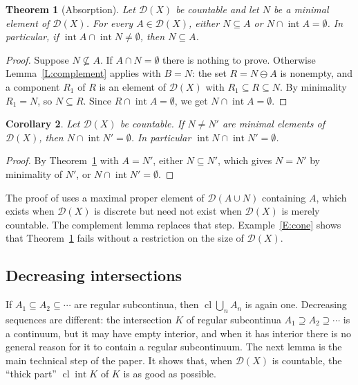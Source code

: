 \documentclass[11pt,reqno]{amsart}
\theoremstyle{plain}
\newtheorem{theorem}{Theorem}[section]
\newtheorem{corollary}[theorem]{Corollary}
\theoremstyle{definition}
\theoremstyle{remark}
\newcommand{\D}{\mathcal{D}}
\newcommand{\cl}{\operatorname{cl}}
\newcommand{\intr}{\operatorname{int}}
\newcommand{\rd}{\ominus}
\begin{document}
\begin{theorem}[Absorption]\label{T:absorption}
Let $\D(X)$ be countable and let $N$ be a minimal element of $\D(X)$. For every $A\in\D(X)$, either $N\subseteq A$ or $N\cap\intr A=\emptyset$. In particular, if $\intr A\cap\intr N\neq\emptyset$, then $N\subseteq A$.
\end{theorem}

\begin{proof}
Suppose $N\not\subseteq A$. If $A\cap N=\emptyset$ there is nothing to prove. Otherwise Lemma~\ref{L:complement} applies with $B=N$: the set $R=N\rd A$ is nonempty, and a component $R_1$ of $R$ is an element of $\D(X)$ with $R_1\subseteq R\subseteq N$. By minimality $R_1=N$, so $N\subseteq R$. Since $R\cap\intr A=\emptyset$, we get $N\cap\intr A=\emptyset$.
\end{proof}

\begin{corollary}\label{C:disjoint}
Let $\D(X)$ be countable. If $N\neq N'$ are minimal elements of $\D(X)$, then $N\cap\intr N'=\emptyset$. In particular $\intr N\cap\intr N'=\emptyset$.
\end{corollary}

\begin{proof}
By Theorem~\ref{T:absorption} with $A=N'$, either $N\subseteq N'$, which gives $N=N'$ by minimality of $N'$, or $N\cap\intr N'=\emptyset$.
\end{proof}

The proof of \cite[Proposition~3.15]{CORa} uses a maximal proper element of $\D(A\cup N)$ containing $A$, which exists when $\D(X)$ is discrete but need not exist when $\D(X)$ is merely countable. The complement lemma replaces that step. Example~\ref{E:cone} shows that Theorem~\ref{T:absorption} fails without a restriction on the size of $\D(X)$.

\subsection{Decreasing intersections}
If $A_1\subseteq A_2\subseteq\cdots$ are regular subcontinua, then $\cl\bigcup_nA_n$ is again one. Decreasing sequences are different: the intersection $K$ of regular subcontinua $A_1\supseteq A_2\supseteq\cdots$ is a continuum, but it may have empty interior, and when it has interior there is no general reason for it to contain a regular subcontinuum. The next lemma is the main technical step of the paper. It shows that, when $\D(X)$ is countable, the ``thick part'' $\cl\intr K$ of $K$ is as good as possible.
\end{document}
